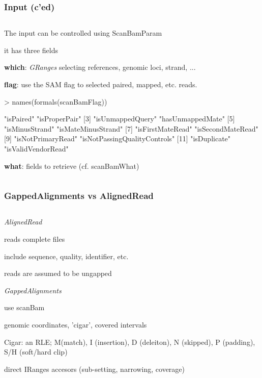 \documentclass{beamer}
\begin{document}
\begin{frame}[fragile]
\frametitle{Input (c'ed)}
\begin{column}{1\textwidth}
  \bit
      \item   The input can be controlled using \small{ScanBamParam}
        \bit
            \item it has three fields
              \bit
                  \item \textbf{which}: \emph{GRanges} selecting references, genomic loci, strand, ...
                    
                  \item \textbf{flag}: use the SAM flag to selected paired, mapped, etc. reads.
                        \begin{uncoverenv}
\begin{Schunk}
\begin{Sinput}
> names(formals(scanBamFlag))
\end{Sinput}
\begin{Soutput}
 [1] "isPaired"                    "isProperPair"               
 [3] "isUnmappedQuery"             "hasUnmappedMate"            
 [5] "isMinusStrand"               "isMateMinusStrand"          
 [7] "isFirstMateRead"             "isSecondMateRead"           
 [9] "isNotPrimaryRead"            "isNotPassingQualityControls"
[11] "isDuplicate"                 "isValidVendorRead"          
\end{Soutput}
\end{Schunk}
                        \end{uncoverenv}    
                  \item \textbf{what}: fields to retrieve (cf. \small{scanBamWhat})
              \eit
        \eit
  \eit
  \end{column}
\end{frame}


\begin{frame}
\frametitle{GappedAlignments vs AlignedRead}
\begin{column}{1\textwidth}
  \bit
      \item \emph{AlignedRead}
        \bit
            \item reads complete files
            \item include sequence, quality, identifier, etc.
            \item reads are assumed to be ungapped
        \eit
      \item \emph{GappedAlignments}
        \bit
            \item use scanBam
            \item genomic coordinates, 'cigar', covered intervals
            \item Cigar: an RLE; M(match), I (insertion), D (deleiton), N (skipped), P (padding), S/H (soft/hard clip)
            \item direct IRanges accesors (sub-setting, narrowing, coverage)
        \eit
  \eit
  \end{column}
\end{frame}
\end{document}
